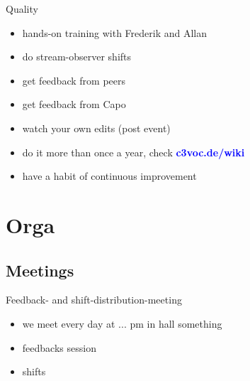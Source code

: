 \documentclass[hyperref={pdfpagelabels=false}]{beamer}
\begin{document}
\begin{frame}{Quality}
\begin{itemize} %
\item  hands-on training with Frederik and Allan %
\item do stream-observer shifts %
\item  get feedback from peers %
\item  get feedback from Capo %
\item  watch your own edits (post event) %
\item  do it more than once a year, check 
\textcolor{blue}{\textbf{c3voc.de/wiki }} %
\item  have a habit of continuous improvement %
\end{itemize} 
\end{frame}

\section{Orga} 
\subsection{Meetings}
\begin{frame}{Feedback- and shift-distribution-meeting}
\begin{itemize}
\item  we meet every day at ... pm in hall something
\item  feedbacks session
\item  shifts
\end{itemize} 
\end{frame}
\end{document}
